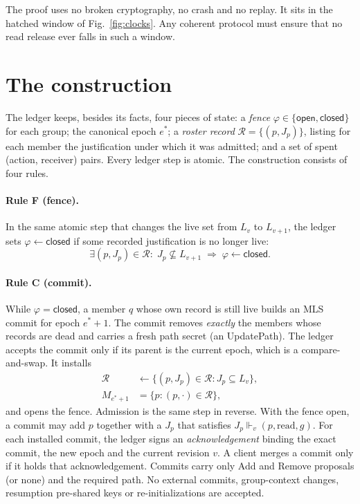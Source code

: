 \documentclass[aps,prx,reprint,superscriptaddress,nofootinbib,floatfix]{revtex4-2}
\theoremstyle{remark}
\newcommand{\Live}{L}                     %
\newcommand{\justifies}{\Vdash}           %
\newcommand{\roster}{M}
\newcommand{\rec}{\mathcal R}             %
\newcommand{\open}{\textsf{open}}
\newcommand{\closed}{\textsf{closed}}
\begin{document}
The proof uses no broken cryptography, no crash and no replay. It sits in the hatched window of Fig.~\ref{fig:clocks}. Any coherent protocol must ensure that no read release ever falls in such a window.

\section{The construction}\label{sec:construction}

The ledger keeps, besides its facts, four pieces of state: a \emph{fence} $\varphi\in\{\open,\closed\}$ for each group; the canonical epoch $e^\ast$; a \emph{roster record} $\rec=\{(p,J_p)\}$, listing for each member the justification under which it was admitted; and a set of spent (action, receiver) pairs. Every ledger step is atomic. The construction consists of four rules.

\paragraph*{Rule F (fence).} In the same atomic step that changes the live set from $\Live_v$ to $\Live_{v+1}$, the ledger sets $\varphi\gets\closed$ if some recorded justification is no longer live:
\begin{equation}
\exists (p,J_p)\in\rec:\; J_p\not\subseteq \Live_{v+1}\;\Longrightarrow\;\varphi\gets\closed .
\label{eq:ruleF}
\end{equation}

\paragraph*{Rule C (commit).} While $\varphi=\closed$, a member $q$ whose own record is still live builds an MLS commit for epoch $e^\ast{+}1$. The commit removes \emph{exactly} the members whose records are dead and carries a fresh path secret (an UpdatePath). The ledger accepts the commit only if its parent is the current epoch, which is a compare-and-swap. It installs
\begin{equation}
\begin{aligned}
\rec&\gets\{(p,J_p)\in\rec: J_p\subseteq \Live_v\},\\
\roster_{e^\ast+1}&=\{p:(p,\cdot)\in\rec\},
\end{aligned}
\label{eq:ruleC}
\end{equation}
and opens the fence. Admission is the same step in reverse. With the fence open, a commit may add $p$ together with a $J_p$ that satisfies $J_p\justifies_v(p,\text{read},g)$. For each installed commit, the ledger signs an \emph{acknowledgement} binding the exact commit, the new epoch and the current revision $v$. A client merges a commit only if it holds that acknowledgement. Commits carry only Add and Remove proposals (or none) and the required path. No external commits, group-context changes, resumption pre-shared keys or re-initializations are accepted.
\end{document}
